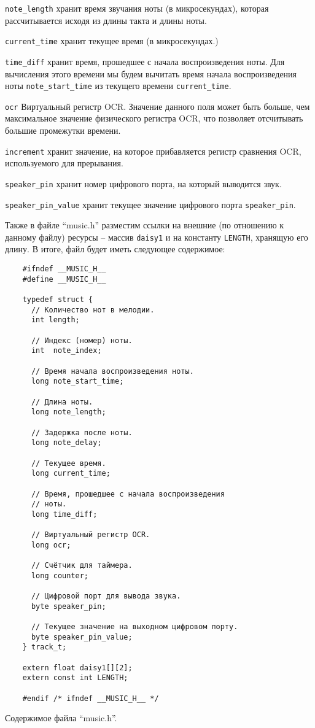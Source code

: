 \documentclass[../sparc.tex]{subfiles}
\begin{document}
\texttt{note_length} хранит время звучания ноты (в микросекундах),
которая рассчитывается исходя из длины такта и длины ноты.

\texttt{current_time} хранит текущее время (в микросекундах.)

\texttt{time_diff} хранит время, прошедшее с начала воспроизведения
ноты.  Для вычисления этого времени мы будем вычитать время начала
воспроизведения ноты \texttt{note_start_time} из текущего времени
\texttt{current_time}.

\texttt{ocr} Виртуальный регистр OCR.  Значение данного поля может быть
больше, чем максимальное значение физического регистра OCR, что позволяет
отсчитывать большие промежутки времени.

\texttt{increment} хранит значение, на которое прибавляется регистр
сравнения OCR, используемого для прерывания.

\texttt{speaker_pin} хранит номер цифрового порта, на который выводится
звук.

\texttt{speaker_pin_value} хранит текущее значение цифрового порта
\texttt{speaker_pin}.

Также в файле ``music.h'' разместим ссылки на внешние (по отношению к данному
файлу) ресурсы -- массив \texttt{daisy1} и на константу
\texttt{LENGTH}, хранящую его длину.  В итоге, файл будет иметь
следующее содержимое:

\begin{listing}[H]
  \begin{verbatim}
    #ifndef __MUSIC_H__
    #define __MUSIC_H__

    typedef struct {
      // Количество нот в мелодии.
      int length;

      // Индекс (номер) ноты.
      int  note_index;

      // Время начала воспроизведения ноты.
      long note_start_time;

      // Длина ноты.
      long note_length;

      // Задержка после ноты.
      long note_delay;

      // Текущее время.
      long current_time;

      // Время, прошедшее с начала воспроизведения
      // ноты.
      long time_diff;

      // Виртуальный регистр OCR.
      long ocr;

      // Счётчик для таймера.
      long counter;

      // Цифровой порт для вывода звука.
      byte speaker_pin;

      // Текущее значение на выходном цифровом порту.
      byte speaker_pin_value;
    } track_t;

    extern float daisy1[][2];
    extern const int LENGTH;

    #endif /* ifndef __MUSIC_H__ */
  \end{verbatim}
  \caption{Содержимое файла ``music.h''.}
  \label{listing:mcu-music-3-2}
\end{listing}
\end{document}
